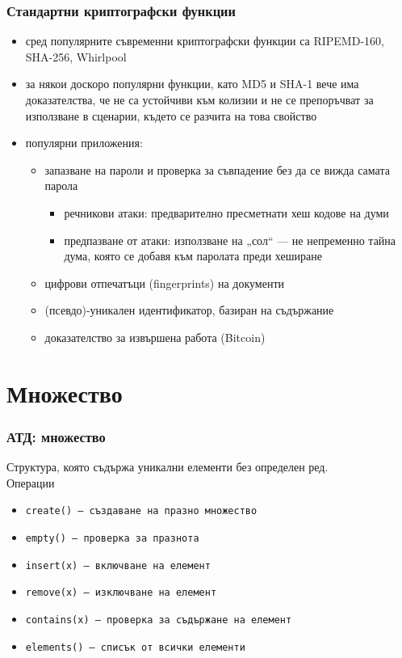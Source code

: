 \documentclass[alsotrans,beameroptions={aspectratio=169}]{beamerswitch}
\begin{document}
\begin{frame}
  \frametitle{Стандартни криптографски функции}
  \begin{itemize}[<+->]
  \item сред популярните съвременни криптографски функции са RIPEMD-160, SHA-256, Whirlpool
  \item за някои доскоро популярни функции, като MD5 и SHA-1 вече има доказателства, че не са устойчиви към колизии и не се препоръчват за използване в сценарии, където се разчита на това свойство
  \item популярни приложения:
    \begin{itemize}
    \item запазване на пароли и проверка за съвпадение без да се вижда самата парола
      \begin{itemize}
      \item речникови атаки: предварително пресметнати хеш кодове на думи
      \item предпазване от атаки: използване на „сол“ --- не непременно тайна дума, която се добавя към паролата преди хеширане
      \end{itemize}
    \item цифрови отпечатъци (fingerprints) на документи
    \item (псевдо)-уникален идентификатор, базиран на съдържание
    \item доказателство за извършена работа (Bitcoin)
    \end{itemize}
  \end{itemize}
\end{frame}

\section{Множество}

\begin{frame}
  \frametitle{АТД: множество}
  Структура, която съдържа уникални елементи без определен ред.\\
  Операции
  \begin{itemize}
  \item \tt{create()} --- създаване на празно множество
  \item \tt{empty()} --- проверка за празнота
  \item \tt{insert(x)} --- включване на елемент
  \item \tt{remove(x)} --- изключване на елемент
  \item \tt{contains(x)} --- проверка за съдържане на елемент
  \item \tt{elements()} --- списък от всички елементи
  \end{itemize}
\end{frame}
\end{document}

